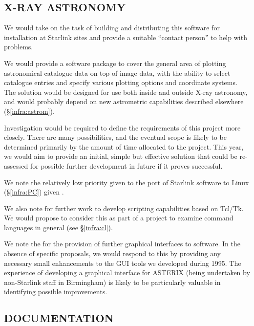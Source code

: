 \subsection{X-RAY ASTRONOMY}

{We would take on the task of building and distributing this software
for installation at Starlink sites and provide a suitable ``contact
person'' to help with problems.}

{We would provide a software package to cover the general area of
plotting astronomical catalogue data on top of image data, with the
ability to select catalogue entries and specify various plotting
options and coordinate systems. The solution would be designed for use
both inside and outside X-ray astronomy, and would probably depend on
new astrometric capabilities described elsewhere
(\S\ref{infra:astrom}).

Investigation would be required to define the requirements of this
project more closely. There are many possibilities, and the eventual
scope is likely to be determined primarily by the amount of time
allocated to the project. This year, we would aim to provide an
initial, simple but effective solution that could be re-assessed for
possible further development in future if it proves successful.}

{We note the relatively low priority given to the port of Starlink
software to Linux (\S\ref{infra:PC}) given .}

{We also note  for further work
to develop scripting capabilities based on Tcl/Tk. We would propose to
consider this as part of a project to examine command languages in
general (see \S\ref{infra:cl}).}

{We note the  for the provision of
further graphical interfaces to software. In the absence of specific
proposals, we would respond to this by providing any necessary small
enhancements to the GUI tools we developed during 1995. The experience
of developing a graphical interface for ASTERIX (being undertaken by
non-Starlink staff in Birmingham) is likely to be particularly
valuable in identifying possible improvements.}

\subsection{DOCUMENTATION}

